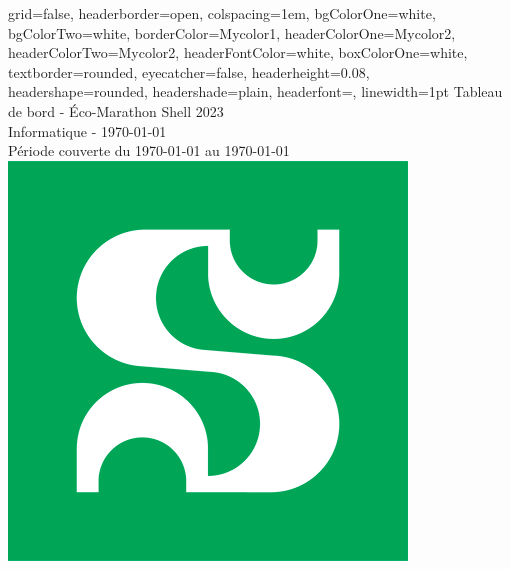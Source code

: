\documentclass[a0paper,portrait]{baposter}
\begin{document}

\begin{poster}
{
grid=false,
headerborder=open, %
colspacing=1em, %
bgColorOne=white, %
bgColorTwo=white, %
borderColor=Mycolor1, %
headerColorOne=Mycolor2, %
headerColorTwo=Mycolor2, %
headerFontColor=white, %
boxColorOne=white, %
textborder=rounded, %
eyecatcher=false, %
headerheight=0.08\textheight, %
headershape=rounded, %
headershade=plain,
headerfont=\Large\textsf, %
linewidth=1pt %
}
{}
%
%
{\textsf{{Tableau de bord - Éco-Marathon Shell 2023}}} %
{\sf\vspace{0.1em}\\
Informatique  -  {\AdvanceDate[0]\today} 
\vspace{0.1em}\\
\small{ Période couverte du {\AdvanceDate[-7]\today} au {\AdvanceDate[0]\today}
}
}
{\includegraphics[width=.1\linewidth]{img/udes.png}} %

\end{poster}
\end{document}
